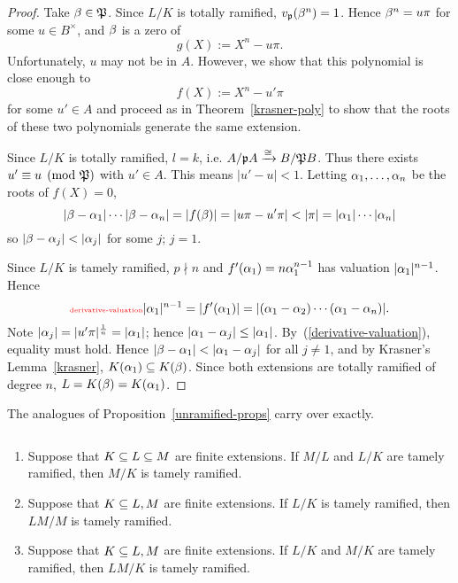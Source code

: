 \begin{proof}
%
Take $\beta\in \mathfrak{P}$. Since $L/K$ is totally ramified, $v_{\mathfrak{p}}(\beta^n)=1$. Hence $\beta^n=u\pi$ for some $u\in B^{\times}$, and $\beta$ is a zero of
\[
g(X):=X^n-u\pi.
\]
Unfortunately, $u$ may not be in $A$. However, we show that this polynomial is close enough to 
\[
f(X):=X^n-u'\pi
\]
for some $u'\in A$ and proceed as in Theorem~\ref{krasner-poly} to show that the roots of these two polynomials generate the same extension.

Since $L/K$ is totally ramified, $l=k$, i.e. $A/\mathfrak{p} A\xrightarrow{\cong} B/\mathfrak{P} B$. Thus there exists $u'\equiv u\pmod{\mathfrak{P}}$ with $u'\in A$. This means $|u'-u|<1$. Letting $\alpha_1,\ldots, \alpha_n$ be the roots of $f(X)=0$,
\[
|\be-\al_1|\cdots |\be-\al_n|=|f(\be)|=|u\pi-u'\pi|<|\pi|=|\al_1|\cdots |\al_n|
\]
so $|\be-\al_j|<|\al_j|$ for some $j$; \wog{} $j=1$.

Since $L/K$ is tamely ramified, $p\nmid n$ and  $f'(\alpha_1)=n\alpha_1^{n-1}$ has valuation $|\alpha_1|^{n-1}$. Hence
\begin{equation}\llabel{derivative-valuation}
|\al_1|^{n-1}=|f'(\al_1)|=|(\al_1-\al_2)\cdots (\al_1-\al_n)|.
\end{equation}
Note $|\alpha_j|=|u'\pi|^{\frac{1}{n}}=|\alpha_1|$; hence $|\alpha_1-\alpha_j|\le |\alpha_1|$. By~(\ref{derivative-valuation}), equality must hold. Hence $|\be-\al_1|<|\al_1-\al_j|$ for all $j\ne 1$, and by Krasner's Lemma~\ref{krasner}, $K(\alpha_1)\subseteq K(\beta)$. Since both extensions are totally ramified of degree $n$, $L=K(\beta)=K(\alpha_1)$.
\end{proof}
The analogues of Proposition~\ref{unramified-props} carry over exactly.
\begin{pr}$\,$
\begin{enumerate}
\item
Suppose that $K\subseteq L\subseteq M$ are finite extensions. If $M/L$ and $L/K$ are tamely ramified, then $M/K$ is tamely ramified.
\item
Suppose that $K\subseteq L,M$ are finite extensions. If $L/K$ is tamely ramified, then $LM/M$ is tamely ramified.
\item
Suppose that $K\subseteq L,M$ are finite extensions. If $L/K$ and $M/K$ are tamely ramified, then $LM/K$ is tamely ramified.
\end{enumerate}
\end{pr}
